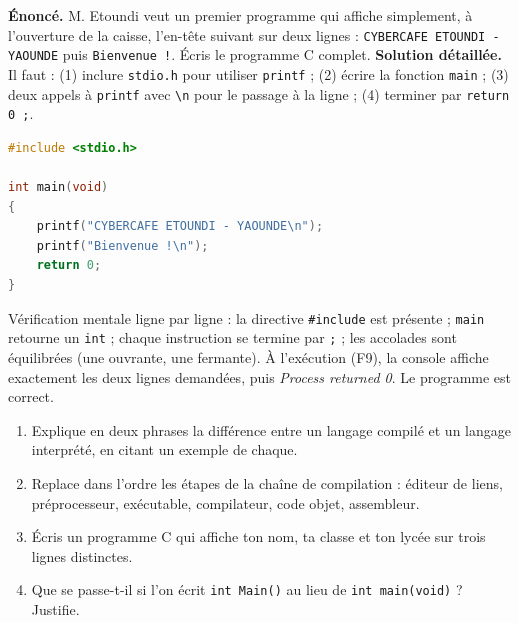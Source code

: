 \documentclass[11pt]{article}
\begin{document}
\begin{exoresolu}
\textbf{Énoncé.} M. Etoundi veut un premier programme qui affiche simplement, à l'ouverture de la caisse, l'en-tête suivant sur deux lignes : \texttt{CYBERCAFE ETOUNDI - YAOUNDE} puis \texttt{Bienvenue !}. Écris le programme C complet.
\tcblower
\textbf{Solution détaillée.} Il faut : (1) inclure \texttt{stdio.h} pour utiliser \texttt{printf} ; (2) écrire la fonction \texttt{main} ; (3) deux appels à \texttt{printf} avec \texttt{\textbackslash n} pour le passage à la ligne ; (4) terminer par \texttt{return 0 ;}.
\begin{lstlisting}[language=C]
#include <stdio.h>

int main(void)
{
    printf("CYBERCAFE ETOUNDI - YAOUNDE\n");
    printf("Bienvenue !\n");
    return 0;
}
\end{lstlisting}
Vérification mentale ligne par ligne : la directive \texttt{\#include} est présente ; \texttt{main} retourne un \texttt{int} ; chaque instruction se termine par \texttt{;} ; les accolades sont équilibrées (une ouvrante, une fermante). À l'exécution (F9), la console affiche exactement les deux lignes demandées, puis \emph{Process returned 0}. Le programme est correct.
\end{exoresolu}

\begin{exercice}
\begin{enumerate}
\item Explique en deux phrases la différence entre un langage compilé et un langage interprété, en citant un exemple de chaque.
\item Replace dans l'ordre les étapes de la chaîne de compilation : éditeur de liens, préprocesseur, exécutable, compilateur, code objet, assembleur.
\item Écris un programme C qui affiche ton nom, ta classe et ton lycée sur trois lignes distinctes.
\item Que se passe-t-il si l'on écrit \texttt{int Main()} au lieu de \texttt{int main(void)} ? Justifie.
\end{enumerate}
\end{exercice}
\end{document}
